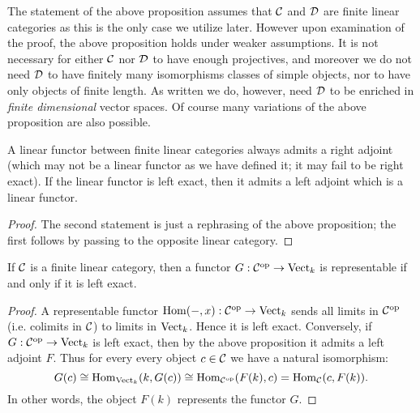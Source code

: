 \documentclass{amsart}
\begin{document}
\begin{remark}
	The statement of the above proposition assumes that $\mathcal C$ and $\mathcal D$ are finite linear categories as this is the only case we utilize later. However upon examination of the proof, the above proposition holds under weaker assumptions. It is not necessary for either $\mathcal C$ nor $\mathcal D$ to have enough projectives, and moreover we do not need $\mathcal D$ to have finitely many isomorphisms classes of simple objects, nor to have only objects of finite length. As written we do, however, need $\mathcal D$ to be enriched in {\em finite dimensional} vector spaces. Of course many variations of the above proposition are also possible. 
\end{remark}

\begin{corollary}
	A linear functor between finite linear categories always admits a right adjoint (which may not be a linear functor as we have defined it; it may fail to be right exact). If the linear functor is left exact, then it admits a left adjoint which is a linear functor. 
\end{corollary}

\begin{proof}
	The second statement is just a rephrasing of the above proposition; the first follows by passing to the opposite linear category.  
\end{proof}


\begin{corollary}
If $\mathcal C$ is a finite linear category, then a functor $G: \mathcal C^\textrm{op} \to \mathrm{Vect}_k$ is representable if and only if it is left exact. 
\end{corollary}

\begin{proof}
	A representable functor $\operatorname{Hom}(-, x):\mathcal C^\text{op} \to \mathrm{Vect}_k$ sends all limits in $\mathcal C^\text{op}$ (i.e. colimits in $\mathcal C$) to limits in $\mathrm{Vect}_k$. Hence it is left exact. 
%
%		
Conversely, if $G: \mathcal C^\text{op} \to \mathrm{Vect}_k$ is left exact, then by the above proposition it admits a left adjoint $F$. Thus for every every object $c \in \mathcal C$ we have a natural isomorphism:
	\begin{equation*}
		G(c) \cong \operatorname{Hom}_{\mathrm{Vect}_k}( k, G(c)) \cong \operatorname{Hom}_{\mathcal C^{\mathrm{op}}}( F(k), c) = \operatorname{Hom}_{\mathcal C}(c, F(k) ).
	\end{equation*}
	In other words,  the object $F(k)$ represents the functor $G$. 
\end{proof}
\end{document}
